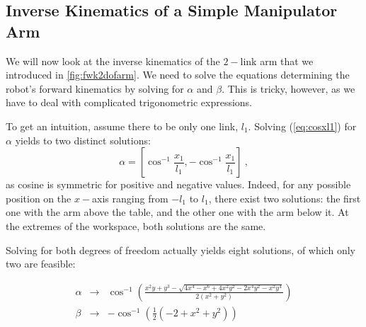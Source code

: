 \subsection{Inverse Kinematics of a Simple Manipulator Arm}

We will now look at the inverse kinematics of the $2-$link arm that we introduced in \cref{fig:fwk2dofarm}. We need to solve the equations determining the robot's forward kinematics by solving for $\alpha$ and $ \beta$.
This is tricky, however, as we have to deal with complicated trigonometric expressions.

To get an intuition, assume there to be only one link, $l_1$.  Solving (\ref{eq:cosxl1}) for $\alpha$ yields to two distinct solutions:
\begin{equation}
\alpha = \left[\cos^{-1}\frac{x_1}{l_1},-\cos^{-1}\frac{x_1}{l_1}\right]\ ,
\end{equation}
as cosine is symmetric for positive and negative values.
Indeed, for any possible position on the $x-$axis ranging from $-l_1$ to $l_1$, there exist two solutions: the first one with the arm above the table, and the other one with the arm below it.
At the extremes of the workspace, both solutions are the same.


Solving for both degrees of freedom actually yields eight solutions, of which only two are feasible:

\begin{eqnarray}
\alpha &\rightarrow& \cos^{-1}\left(\frac{x^2 y + y^3 - \sqrt{4 x^4 - x^6 + 4 x^2 y^2 - 2 x^4 y^2 - x^2 y^4}}{2 (x^2 + y^2)}\right) \nonumber \\
\beta &\rightarrow& -\cos^{-1}\left( \frac{1}{2}(-2+x^2+y^2) \right)
\end{eqnarray}

